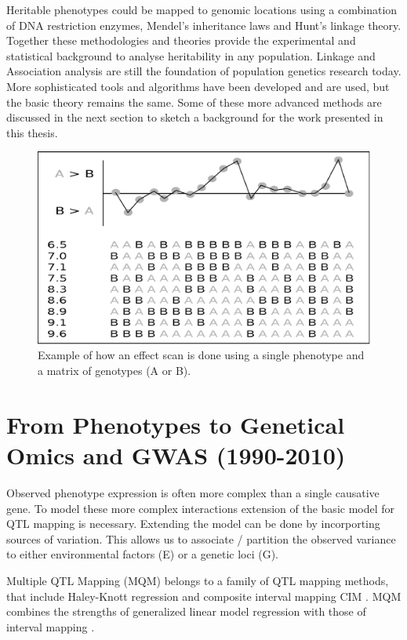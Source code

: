 Heritable phenotypes could be mapped to genomic locations using a combination of DNA 
restriction enzymes, Mendel's inheritance laws and Hunt's linkage theory. Together these 
methodologies and theories provide the experimental and statistical background to 
analyse heritability in any population. Linkage and Association analysis are still the 
foundation of population genetics research today. More sophisticated tools and algorithms have been 
developed and are used, but the basic theory remains the same. Some of these more 
advanced methods are discussed in the next section to sketch a background for the work 
presented in this thesis.

\begin{figure}[h!]
 \centering
    \includegraphics[width=1.0\textwidth]{eps/image_1_1}
  \caption[Effect scan across the genome.]
    {Example of how an effect scan is done using a single phenotype and a matrix of genotypes (A or B).}
\end{figure}

\section{From Phenotypes to Genetical Omics and GWAS (1990-2010)}

Observed phenotype expression is often more complex than a single causative gene. 
To model these more complex interactions extension of the basic model for QTL mapping is 
necessary. Extending the model can be done by incorporting sources of variation. This allows 
us to associate / partition the observed variance to either environmental factors (E) or a 
genetic loci (G).

Multiple QTL Mapping (MQM) belongs to a family of QTL mapping methods, that include Haley-Knott 
regression \cite{Haley:1992} and composite interval mapping CIM \cite{Zeng:1994}. MQM combines 
the strengths of generalized linear model regression with those of interval mapping 
\cite{Jansen:1993, Jansen:1994b}. 

